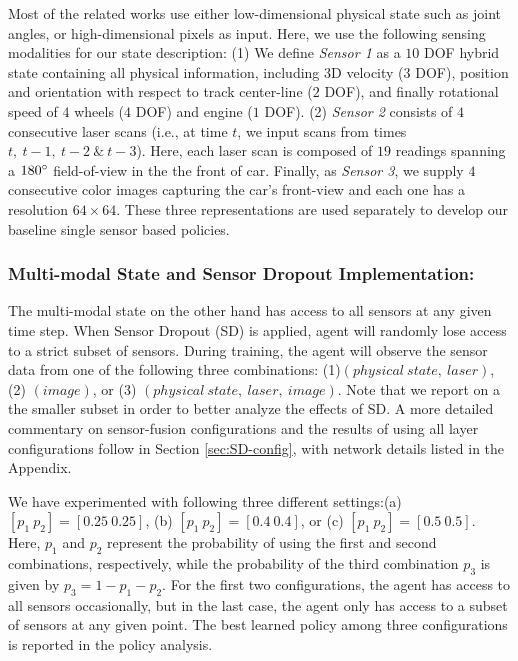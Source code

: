 \documentclass[../thesis.tex]{subfiles}
\begin{document}
% 
Most of the related works use either low-dimensional physical state such as joint angles, or high-dimensional pixels as input. Here, we use the following sensing modalities for our state description: (1) We define \emph{Sensor 1} as a $10$ DOF hybrid state containing all physical information, including $3$D velocity ($3$ DOF), position and orientation with respect to track center-line ($2$ DOF), and finally rotational speed of $4$ wheels ($4$ DOF) and engine ($1$ DOF). (2) \emph{Sensor 2} consists of $4$ consecutive laser scans (i.e., at time $t$, we input scans from times $t,~ t-1,~t-2~\&~t-3$). Here, each laser scan is composed of $19$ readings spanning a $180\degree$ field-of-view in the the front of car. Finally, as \emph{Sensor 3}, we supply $4$ consecutive color images capturing the car's front-view and each one has a resolution $64 \times 64$. These three representations are used separately to develop our baseline single sensor based policies. 

\subsubsection{Multi-modal State and Sensor Dropout Implementation:} \label{sec:SD-implement}

The multi-modal state on the other hand has access to all sensors at any given time step. When Sensor Dropout (SD) is applied, agent will randomly lose access to a strict subset of sensors. During training, the agent will observe the sensor data from one of the following three combinations: (1)$(physical~state,~laser)$, (2) $(image)$, or (3) $(physical~state,~laser,~image)$. Note that we report on a the smaller subset in order to better analyze the effects of SD. A more detailed commentary on sensor-fusion configurations and the results of using all layer configurations follow in Section \ref{sec:SD-config}, with network details listed in the Appendix.

We have experimented with following three different settings:(a) $[p_1~p_2] = [0.25~0.25]$, (b) $[p_1~p_2] = [0.4~0.4]$, or (c) $[p_1~p_2] = [0.5~0.5]$. Here, $p_1$ and $p_2$ represent the probability of using the first and second combinations, respectively, while the probability of the third combination $p_3$ is given by $p_3 = 1 - p_1 - p_2$. For the first two configurations, the agent has access to all sensors occasionally, but in the last case, the agent only has access to a subset of sensors at any given point. The best learned policy among three configurations is reported in the policy analysis.
\end{document}
